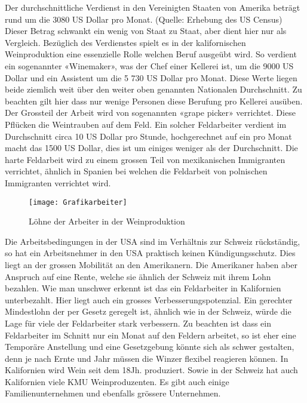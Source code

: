 Der durchschnittliche Verdienst in den Vereinigten Staaten von Amerika beträgt rund um die 3080 US Dollar pro Monat. (Quelle: Erhebung des US Census) Dieser Betrag schwankt ein wenig von Staat zu Staat, aber dient hier nur als Vergleich. Bezüglich des Verdienstes spielt es in der kalifornischen Weinproduktion eine essenzielle Rolle welchen Beruf ausgeübt wird. So verdient ein sogenannter «Winemaker», was der Chef einer Kellerei ist, um die 9000 US
Dollar und ein Assistent um die 5 730 US Dollar pro Monat. Diese Werte liegen beide ziemlich weit über den weiter oben genannten Nationalen Durchschnitt. Zu beachten gilt hier dass nur wenige Personen diese Berufung pro Kellerei ausüben. Der Grossteil der Arbeit
wird von sogenannten «grape picker» verrichtet. Diese Pflücken die Weintrauben auf dem Feld. Ein solcher Feldarbeiter verdient im Durchschnitt circa 10 US Dollar pro Stunde,
\cite{_farm_????} hochgerechnet auf ein pro Monat macht das 1500 US Dollar, dies ist um einiges weniger als der Durchschnitt. Die harte Feldarbeit wird zu einem grossen Teil von mexikanischen Immigranten verrichtet, ähnlich in Spanien bei welchen die Feldarbeit von polnischen Immigranten verrichtet wird.
\begin{figure}[H]
	\centering
	\texttt{[image: Grafikarbeiter]}
	\caption{Löhne der Arbeiter in der Weinproduktion}
\end{figure}
Die Arbeitsbedingungen in der USA sind im Verhältnis zur Schweiz rückständig, so hat ein Arbeitsnehmer in den USA praktisch keinen Kündigungsschutz. Dies liegt an der grossen Mobilität an den Amerikanern. Die Amerikaner haben aber Anspruch auf eine Rente, welche sie ähnlich der Schweiz mit ihrem Lohn bezahlen. \cite{_arbeitszeiten_????} Wie man unschwer erkennt ist das ein Feldarbeiter in Kalifornien unterbezahlt. Hier liegt auch ein grosses Verbesserungspotenzial. Ein gerechter Mindestlohn der per Gesetz geregelt ist, ähnlich wie in der Schweiz, würde die Lage für viele der Feldarbeiter stark verbessern. Zu beachten ist dass ein Feldarbeiter im Schnitt nur ein Monat auf den Feldern arbeitet, so ist eher eine Temporäre Anstellung und eine Gesetzgebung könnte sich als schwer gestalten, denn je nach Ernte und Jahr  müssen die Winzer flexibel reagieren können. In Kalifornien wird Wein seit dem 18Jh. produziert. Sowie in der Schweiz hat auch Kalifornien viele KMU Weinproduzenten. Es gibt auch einige Familienunternehmen und ebenfalls grössere Unternehmen.



